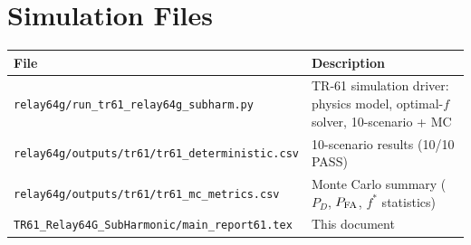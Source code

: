 \documentclass[11pt,a4paper]{article}
\newcommand{\fopt}{f^*}
\begin{document}
\appendix
\section{Simulation Files}
\label{app:files}

\begin{tabular}{p{}p{}}
  \toprule
  File & Description \\
  \midrule
  \texttt{relay64g/run\_tr61\_relay64g\_subharm.py}
    & TR-61 simulation driver: physics model, optimal-$f$ solver, 10-scenario + MC \\
  \texttt{relay64g/outputs/tr61/tr61\_deterministic.csv}
    & 10-scenario results (10/10 PASS) \\
  \texttt{relay64g/outputs/tr61/tr61\_mc\_metrics.csv}
    & Monte Carlo summary ($P_D$, $P_{\rm FA}$, $\fopt$ statistics) \\
  \texttt{TR61\_Relay64G\_SubHarmonic/main\_report61.tex}
    & This document \\
  \bottomrule
\end{tabular}



\end{document}
